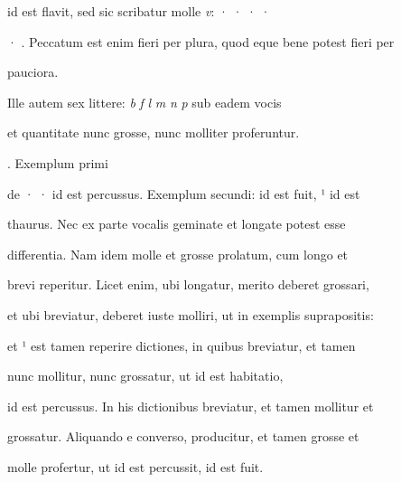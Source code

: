 id est flavit, sed sic scribatur molle \textit{v}: · · · ·

· . Peccatum est enim fieri per plura, quod eque bene potest fieri per 

\splitlines

pauciora.

\indentK Ille autem sex littere: \textit{b} \textit{f} \textit{l} \textit{m} \textit{n} \textit{p} sub eadem vocis 


\newsplitline

 et quantitate nunc grosse, nunc molliter proferuntur.

\indentK {}. Exemplum primi

\fulllines


de · ·  id est percussus. Exemplum secundi:   id est fuit, ¹ id est

thaurus. Nec ex parte vocalis geminate et longate potest esse

differentia. Nam idem  molle et grosse prolatum, cum  longo et 

brevi reperitur. Licet enim, ubi  longatur, merito  deberet grossari,

et ubi  breviatur, deberet iuste molliri, ut in exemplis suprapositis:


 et ¹ est tamen reperire dictiones, in quibus  breviatur, et tamen 

nunc mollitur, nunc grossatur, ut  id est habitatio, 

id est percussus. In his dictionibus  breviatur, et tamen  mollitur et

grossatur. Aliquando e converso,  producitur, et tamen  grosse et

\splitlines

molle profertur, ut  id est percussit,   id est fuit.

